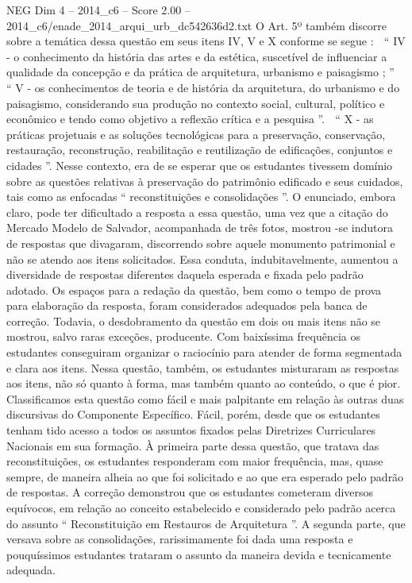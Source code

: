 \begin{textsample}{NEG Dim 4 – 2014\_c6 – Score 2.00 – 2014\_c6/enade\_2014\_arqui\_urb\_dc542636d2.txt}
O Art. 5º também discorre sobre a temática dessa questão em seus itens IV, V e X conforme se segue :  “ IV - o conhecimento da história das artes e da estética, suscetível de influenciar a qualidade da concepção e da prática de arquitetura, urbanismo e paisagismo ; ”  “ V - os conhecimentos de teoria e de história da arquitetura, do urbanismo e do paisagismo, considerando sua produção no contexto social, cultural, político e econômico e tendo como objetivo a reflexão crítica e a pesquisa ”.  “ X - as práticas projetuais e as soluções tecnológicas para a preservação, conservação, restauração, reconstrução, reabilitação e reutilização de edificações, conjuntos e cidades ”.
Nesse contexto, era de se esperar que os estudantes tivessem domínio sobre as questões relativas à preservação do patrimônio edificado e seus cuidados, tais como as enfocadas “ reconstituições e consolidações ”.
O enunciado, embora claro, pode ter dificultado a resposta a essa questão, uma vez que a citação do Mercado Modelo de Salvador, acompanhada de três fotos, mostrou -se indutora de respostas que divagaram, discorrendo sobre aquele monumento patrimonial e não se atendo aos itens solicitados.
Essa conduta, indubitavelmente, aumentou a diversidade de respostas diferentes daquela esperada e fixada pelo padrão adotado.
Os espaços para a redação da questão, bem como o tempo de prova para elaboração da resposta, foram considerados adequados pela banca de correção.
Todavia, o desdobramento da questão em dois ou mais itens não se mostrou, salvo raras exceções, producente.
Com baixíssima frequência os estudantes conseguiram organizar o raciocínio para atender de forma segmentada e clara aos itens.
Nessa questão, também, os estudantes misturaram as respostas aos itens, não só quanto à forma, mas também quanto ao conteúdo, o que é pior.
Classificamos esta questão como fácil e mais palpitante em relação às outras duas discursivas do Componente Específico.
Fácil, porém, desde que os estudantes tenham tido acesso a todos os assuntos fixados pelas Diretrizes Curriculares Nacionais em sua formação.
À primeira parte dessa questão, que tratava das reconstituições, os estudantes responderam com maior frequência, mas, quase sempre, de maneira alheia ao que foi solicitado e ao que era esperado pelo padrão de respostas.
A correção demonstrou que os estudantes cometeram diversos equívocos, em relação ao conceito estabelecido e considerado pelo padrão acerca do assunto “ Reconstituição em Restauros de Arquitetura ”.
A segunda parte, que versava sobre as consolidações, rarissimamente foi dada uma resposta e pouquíssimos estudantes trataram o assunto da maneira devida e tecnicamente adequada.

\end{textsample}
